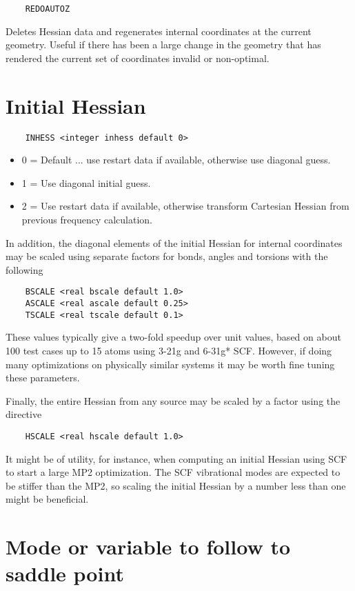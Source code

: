 \begin{verbatim}
    REDOAUTOZ
\end{verbatim}

Deletes Hessian data and regenerates internal coordinates at the
current geometry.  Useful if there has been a large change in the
geometry that has rendered the current set of coordinates invalid or
non-optimal.

\section{Initial Hessian}
\begin{verbatim}
    INHESS <integer inhess default 0>
\end{verbatim}

\begin{itemize}
\item  0 = Default ... use restart data if available, otherwise use diagonal guess.
\item  1 = Use diagonal initial guess.
\item  2 = Use restart data if available, otherwise transform
Cartesian Hessian from previous frequency calculation.
\end{itemize}


In addition, the diagonal elements of the initial Hessian for
internal coordinates may be scaled using separate factors for
bonds, angles and torsions with the following
\begin{verbatim}
    BSCALE <real bscale default 1.0>
    ASCALE <real ascale default 0.25>
    TSCALE <real tscale default 0.1>
\end{verbatim}
These values typically give a two-fold speedup over unit values, based
on about 100 test cases up to 15 atoms using 3-21g and 6-31g* SCF.
However, if doing many optimizations on physically similar systems it
may be worth fine tuning these parameters.

Finally, the entire Hessian from any source may be scaled
by a factor using the directive
\begin{verbatim}
    HSCALE <real hscale default 1.0>
\end{verbatim}
It might be of utility, for instance, when computing an initial
Hessian using SCF to start a large MP2 optimization.  The SCF
vibrational modes are expected to be stiffer than the MP2, so scaling
the initial Hessian by a number less than one might be beneficial.


\section{Mode or variable to follow to saddle point}

